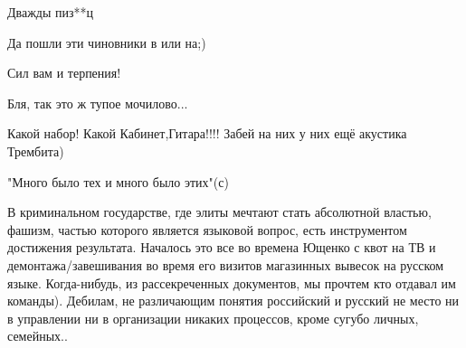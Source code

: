 \begin{itemize}
Дважды пиз**ц

 
Да пошли эти чиновники в или на;)

 
Сил вам и терпения!

 
Бля, так это ж тупое мочилово...

 
Какой набор! Какой Кабинет,Гитара!!!! Забей на них у них ещё акустика Трембита)

 
"Много было тех и много было этих"(с)

 

В криминальном государстве, где элиты мечтают стать абсолютной властью, фашизм,
частью которого является языковой вопрос, есть инструментом достижения
результата. Началось это все во времена Ющенко с квот на ТВ и
демонтажа/завешивания во время его визитов магазинных вывесок на русском языке.
Когда-нибудь, из рассекреченных документов, мы прочтем кто отдавал им команды).
Дебилам, не различающим понятия российский и русский не место ни в управлении
ни в организации никаких процессов, кроме сугубо личных, семейных.. 


\end{itemize}
